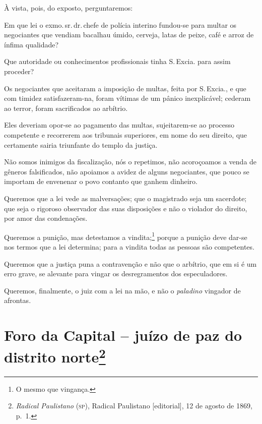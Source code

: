 À vista, pois, do exposto, perguntaremos:

Em que lei o exmo.\,sr.\,dr.\,chefe de polícia interino fundou-se para
multar os negociantes que vendiam bacalhau úmido, cerveja, latas de
peixe, café e arroz de ínfima qualidade?

Que autoridade ou conhecimentos profissionais tinha S.\,Excia. para assim
proceder?

Os negociantes que aceitaram a imposição de multas, feita por S.\,Excia.,
e que com timidez satisfazeram-na, foram vítimas de um pânico
inexplicável; cederam ao terror, foram sacrificados ao arbítrio.

Eles deveriam opor-se ao pagamento das multas, sujeitarem-se ao processo
competente e recorrerem aos tribunais superiores, em nome do seu
direito, que certamente sairia triunfante do templo da justiça.

Não somos inimigos da fiscalização, nós o repetimos, não acoroçoamos a
venda de gêneros falsificados, não apoiamos a avidez de alguns
negociantes, que pouco se importam de envenenar o povo contanto que
ganhem dinheiro.

Queremos que a lei vede as malversações; que o magistrado seja um
sacerdote; que seja o rigoroso observador das suas disposições e não o
violador do direito, por amor das condenações.

Queremos a punição, mas detestamos a vindita;\footnote{O mesmo que
  vingança.} porque a punição deve dar-se nos termos que a lei
determina; para a vindita todas as pessoas são competentes.

Queremos que a justiça puna a contravenção e não que o arbítrio, que em
si é um erro grave, se alevante para vingar os desregramentos dos
especuladores.

Queremos, finalmente, o juiz com a lei na mão, e não o \emph{paladino}
vingador de afrontas.

\chapter{Foro da Capital -- juízo de paz do distrito norte\footnote{\emph{Radical Paulistano} (\textsc{sp}), Radical Paulistano {[}editorial{]},
  12 de agosto de 1869, p.~1.}}

